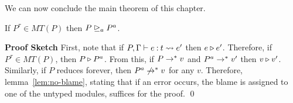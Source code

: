 {We can now conclude the main theorem of this chapter.

\begin{theorem}[Soundness of MT]
\label{thm:dlsmain}
If $P^\tau \in MT(P)$ then $P \trianglerighteq_{a} P^a$.
\end{theorem}

\noindent\textbf{Proof Sketch}
First, note that if $P,\Gamma \vdash {\ensuremath{e \mathbin{:} t}} \rightsquigarrow e'$ then
$e \triangleright e'$.  Therefore, if $P^\tau \in MT(P)$, then
$P \triangleright P^a$. 
% 
From this, if $P \rightarrow^* v$ and $P^a \rightarrow^* v'$ then
$v \triangleright v'$. 
Similarly, if $P$ reduces forever, then $P^a \not\rightarrow^* v$ for any
$v$.  Therefore, lemma~\ref{lem:no-blame}, stating that if an error occurs,
the blame is assigned to one of the untyped modules, suffices for the
proof. \qed

}
